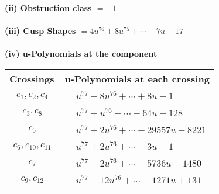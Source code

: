 \documentclass[1p]{elsarticle_modified}
\theoremstyle{definition}
\begin{document}
\flushleft \textbf{(ii) Obstruction class $= -1$}\\~\\
\flushleft \textbf{(iii) Cusp Shapes $= 4 u^{76}+8 u^{75}+\cdots-7 u-17$}\\~\\
\newpage\renewcommand{\arraystretch}{1}
\flushleft \textbf{(iv) u-Polynomials at the component}\newline \\
\begin{tabular}{m{50pt}|m{274pt}}
Crossings & \hspace{64pt}u-Polynomials at each crossing \\
\hline $$\begin{aligned}c_{1},c_{2},c_{4}\end{aligned}$$&$\begin{aligned}
&u^{77}-8 u^{76}+\cdots+8 u-1
\end{aligned}$\\
\hline $$\begin{aligned}c_{3},c_{8}\end{aligned}$$&$\begin{aligned}
&u^{77}+u^{76}+\cdots-64 u-128
\end{aligned}$\\
\hline $$\begin{aligned}c_{5}\end{aligned}$$&$\begin{aligned}
&u^{77}+2 u^{76}+\cdots-29557 u-8221
\end{aligned}$\\
\hline $$\begin{aligned}c_{6},c_{10},c_{11}\end{aligned}$$&$\begin{aligned}
&u^{77}+2 u^{76}+\cdots-3 u-1
\end{aligned}$\\
\hline $$\begin{aligned}c_{7}\end{aligned}$$&$\begin{aligned}
&u^{77}-2 u^{76}+\cdots-5736 u-1480
\end{aligned}$\\
\hline $$\begin{aligned}c_{9},c_{12}\end{aligned}$$&$\begin{aligned}
&u^{77}-12 u^{76}+\cdots-1271 u+131
\end{aligned}$\\
\hline
\end{tabular}\\~\\
\end{document}
